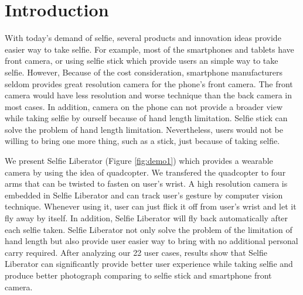 \documentclass{sig-alternate-ipsn13}
\begin{document}
\section{Introduction}

With today's demand of selfie, several products and innovation ideas provide easier way to take selfie. For example, most of the smartphones and tablets have front camera, or using selfie stick which provide users an simple way to take selfie. 
However, 
Because of the cost consideration, smartphone manufacturers seldom provides great resolution camera for the phone's front camera. The front camera would have less resolution and worse technique than the back camera in most cases. In addition, camera on the phone can not provide a broader view while taking selfie by ourself because of hand length limitation. Selfie stick can solve the problem of hand length limitation. Nevertheless, 
users would not be willing to bring one more thing, such as a stick, just because of taking selfie. 

We present Selfie Liberator (Figure \ref{fig:demo1}) which provides a wearable camera by using the idea of quadcopter. We transfered the quadcopter to four arms that can be twisted to fasten on user's wrist. A high resolution camera is embedded in Selfie Liberator and can track user's gesture by computer vision technique. Whenever using it, user can just flick it off from user's wrist and let it fly away by itself. In addition, Selfie Liberator will fly back automatically after each selfie taken. Selfie Liberator not only solve the problem of the limitation of hand length 
but also provide user easier way to bring 
with no additional personal carry required.
After analyzing our 22 user cases, results show that Selfie Liberator can significantly provide better user experience while taking selfie and produce better photograph comparing to selfie stick and smartphone front camera.


\end{document}
